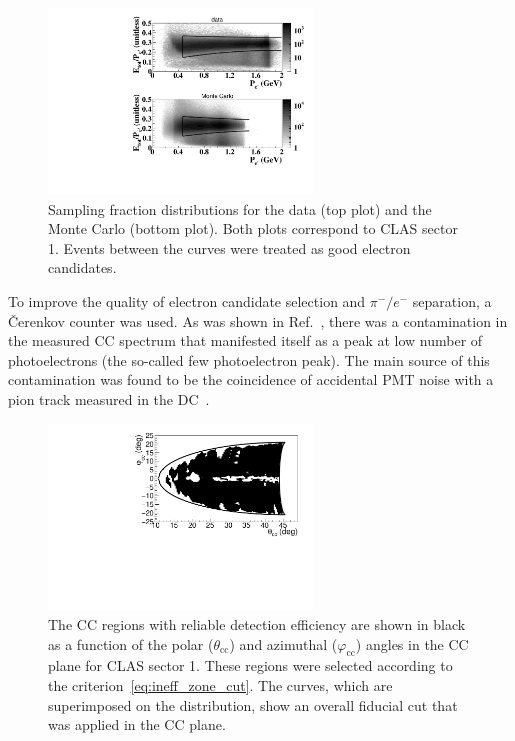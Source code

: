 \documentclass[prc,twocolumn,superscriptaddress,showpacs,amssymb,amsmath,amsfonts,aps,nofootinbib]{revtex4-1}
\begin{document}
\begin{figure}[htp]
\begin{center}
 \includegraphics[width=7cm,keepaspectratio]{pictures/electron_id/ec_cut.pdf}
\vspace{-0.1cm}
\caption{Sampling fraction distributions for the data (top plot) and the Monte Carlo (bottom plot). Both plots correspond to CLAS sector 1. Events between the curves were treated as good electron candidates.}
\label{fig:ec_cut}
\end{center}
\end{figure} 


To improve the quality of electron candidate selection and $\pi^{-}/e^{-}$ separation, a \v Cerenkov counter was used.
As was shown in Ref.~\cite{Osipenko:2004}, there was a contamination in the measured CC spectrum that manifested itself as a peak at low number of photoelectrons (the so-called few photoelectron peak). The main source of this contamination was found to be the coincidence of accidental PMT noise with a  pion track measured in the DC~\cite{Osipenko:2004}. 

\begin{figure}[htp]
\begin{center}

\includegraphics[width=7cm,keepaspectratio]{pictures/electron_id/ph_vs_ph_cc.pdf}
\vspace{-0.1cm}
\caption{The CC regions with reliable detection efficiency are shown in black as a function of the polar ($\theta_{\text{cc}}$) and azimuthal ($\varphi_{\text{cc}}$) angles in the CC plane for CLAS sector 1. These regions were selected according to the criterion~\eqref{eq:ineff_zone_cut}. The curves, which are superimposed on the distribution,  show an overall fiducial cut that was applied in the CC plane.}
\label{fig:ph_vs_ph_cc}
\end{center}
\end{figure} 
\end{document}
